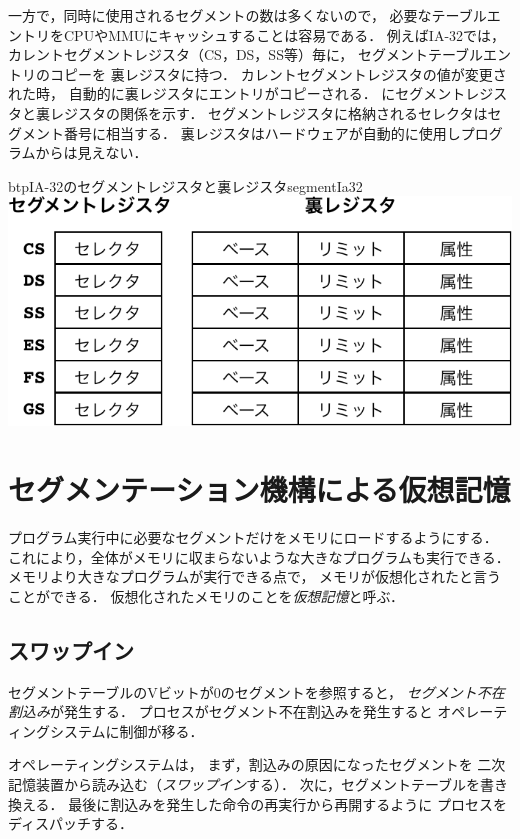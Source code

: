 一方で，同時に使用されるセグメントの数は多くないので，
必要なテーブルエントリをCPUやMMUにキャッシュすることは容易である．
例えばIA-32では，
カレントセグメントレジスタ（CS，DS，SS等）毎に，
セグメントテーブルエントリのコピーを
裏レジスタ\cite{ia32SegmentHiddenReg}に持つ．
カレントセグメントレジスタの値が変更された時，
自動的に裏レジスタにエントリがコピーされる．
にセグメントレジスタと裏レジスタの関係を示す．
セグメントレジスタに格納されるセレクタはセグメント番号に相当する．
裏レジスタはハードウェアが自動的に使用しプログラムからは見えない．

\begin{myfig}{btp}{IA-32のセグメントレジスタと裏レジスタ}{segmentIa32}
  \includegraphics[scale=0.8]{Fig/segmentIa32-crop.pdf}
\end{myfig}

\section{セグメンテーション機構による仮想記憶}
プログラム実行中に必要なセグメントだけをメモリにロードするようにする．
これにより，全体がメモリに収まらないような大きなプログラムも実行できる．
メモリより大きなプログラムが実行できる点で，
メモリが仮想化されたと言うことができる．
仮想化されたメモリのことを\emph{仮想記憶}と呼ぶ．

\subsection{スワップイン}
セグメントテーブルのVビットが0のセグメントを参照すると，
\emph{セグメント不在割込み}が発生する．
プロセスがセグメント不在割込みを発生すると
オペレーティングシステムに制御が移る．

オペレーティングシステムは，
まず，割込みの原因になったセグメントを
二次記憶装置から読み込む（\emph{スワップイン}する）．
次に，セグメントテーブルを書き換える．
最後に割込みを発生した命令の再実行から再開するように
プロセスをディスパッチする．


